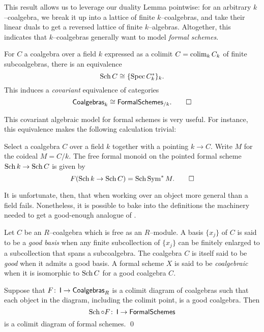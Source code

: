 \noindent This result allows us to leverage our duality Lemma pointwise: for an arbitrary $k$--coalgebra, we break it up into a lattice of finite $k$--coalgebras, and take their linear duals to get a reversed lattice of finite $k$--algebras.  Altogether, this indicates that $k$--coalgebras generally want to model \emph{formal schemes}.

\begin{corollary}\label{CoalgsAndFSchsAgreeOverk}
For $C$ a coalgebra over a field $k$ expressed as a colimit $C = \operatorname*{colim}_k C_k$ of finite subcoalgebras, there is an equivalence \[\operatorname{Sch} C \cong \{\operatorname{Spec} C_k^*\}_k.\]  This induces a \emph{covariant} equivalence of categories \[\mathsf{Coalgebras}_k \cong \mathsf{FormalSchemes}_{/k}. \qed\]
\end{corollary}

This covariant algebraic model for formal schemes is very useful.    For instance, this equivalence makes the following calculation trivial:
\begin{lemma}
Select a coalgebra $C$ over a field $k$ together with a pointing $k \to C$.  Write $M$ for the coideal $M = C / k$.  The free formal monoid on the pointed formal scheme $\operatorname{Sch} k \to \operatorname{Sch} C$ is given by  \[F(\operatorname{Sch} k \to \operatorname{Sch} C) = \operatorname{Sch} \operatorname{Sym}^* M. \qed\]
\end{lemma}

It is unfortunate, then, that when working over an object more general than a field  fails.  Nonetheless, it is possible to bake into the definitions the machinery needed to get a good-enough analogue of .

\begin{definition}
Let $C$ be an $R$--coalgebra which is free as an $R$--module.  A basis $\{x_j\}$ of $C$ is said to be a \textit{good basis} when any finite subcollection of $\{x_j\}$ can be finitely enlarged to a subcollection that spans a subcoalgebra.  The coalgebra $C$ is itself said to be \textit{good} when it admits a good basis.  A formal scheme $X$ is said to be \textit{coalgebraic} when it is isomorphic to $\operatorname{Sch} C$ for a good coalgebra $C$.
\end{definition}

\begin{theorem}\label{CoalgebraicColimitsExist}
Suppose that $F\colon\thinspace \mathsf{I} \to \mathsf{Coalgebras}_R$ is a colimit diagram of coalgebras such that each object in the diagram, including the colimit point, is a good coalgebra.  Then \[\operatorname{Sch} \circ F\colon\thinspace \mathsf{I} \to \mathsf{FormalSchemes}\] is a colimit diagram of formal schemes. \qed
\end{theorem}

